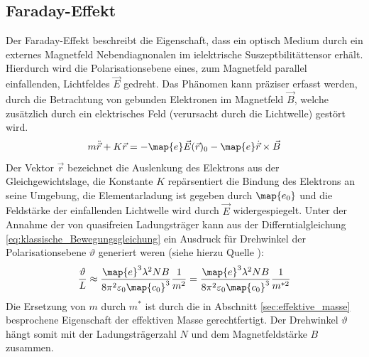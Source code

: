 \subsection{Faraday-Effekt}
Der Faraday-Effekt beschreibt die Eigenschaft, dass ein optisch
Medium durch ein externes Magnetfeld Nebendiagnonalen im ielektrische Suszeptbilitättensor
erhält. Hierdurch wird die Polarisationsebene eines, zum Magnetfeld parallel
einfallenden, Lichtfeldes $\vec{E}$ gedreht. Das Phänomen kann präziser erfasst werden,
durch die Betrachtung von gebunden Elektronen im Magnetfeld $\vec{B}$, welche
zusätzlich durch ein elektrisches Feld (verursacht durch die Lichtwelle) gestört wird.
\begin{equation}
  \label{eq:klassische_Bewegungsgleichung}
  m\ddot{\vec{r}}+K\vec{r}=-\map{e}\vec{E}(\vec{r})_0-\map{e}\dot{\vec{r}}\times\vec{B}
\end{equation}
Der Vektor $\vec{r}$ bezeichnet die Auslenkung des Elektrons aus der Gleichgewichtslage,
die Konstante $K$ repärsentiert die Bindung des Elektrons an seine Umgebung, die Elementarladung
ist gegeben durch $\map{e_0}$ und die Feldstärke der einfallenden Lichtwelle
wird durch $\vec{E}$ widergespiegelt.
Unter der Annahme der von quasifreien Ladungsträger kann
aus der Differntialgleichung \eqref{eq:klassische_Bewegungsgleichung} ein Ausdruck
für Drehwinkel der Polarisationsebene $\vartheta$ generiert weren (siehe hierzu Quelle \cite{anleitungv46}):
\begin{equation}
  \label{eq:drehwinkel}
  \frac{\vartheta}{L}\approx \frac{\map{e}^3\lambda^2 NB}{8\pi^2\varepsilon_0\map{c_0}^3}\frac{1}{m^2} = \frac{\map{e}^3\lambda^2 NB}{8\pi^2\varepsilon_0\map{c_0}^3}\frac{1}{m^{*2}}
\end{equation}
Die Ersetzung von $m$ durch $m^*$ ist durch die in Abschnitt \ref{sec:effektive_masse}
besprochene Eigenschaft der effektiven Masse gerechtfertigt. Der Drehwinkel $\vartheta$ hängt somit
mit der Ladungsträgerzahl $N$ und dem Magnetfeldstärke $B$ zusammen.
